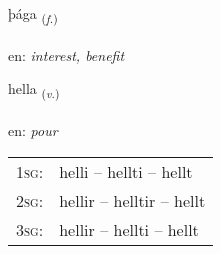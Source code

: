 \documentclass[frontgrid, backgrid]{flacards}\usepackage[]{graphicx}\usepackage[]{color}
\begin{document}
\renewcommand{\flhead}{\vskip5pt \fboxsep=0pt {\small\bfseries\footnotesize Nafnorð | Noun}}
\renewcommand{\fcfoot}{\vskip5pt \fboxsep=0pt \hspace{2pt}{\small\bfseries\footnotesize 2K}}

\renewcommand{\blhead}{\vskip5pt {\small\bfseries\footnotesize Nafnorð | Noun }}
\renewcommand{\bcfoot}{\vskip5pt \hspace{2pt}{\small\bfseries\footnotesize 2K}}


{þága \small{\textsubscript{(\textit{f.})}} \\[1ex] %
\textphonetic{[θauːɣa]} \\
en: \emph{interest, benefit} \\  [2ex]
\renewcommand*{\arraystretch}{0.8}
}

\renewcommand{\flhead}{\vskip5pt \fboxsep=0pt {\small\bfseries\footnotesize Sagnorð | Verb}}
\renewcommand{\fcfoot}{\vskip5pt \fboxsep=0pt \hspace{2pt}{\small\bfseries\footnotesize 2K}}

\renewcommand{\blhead}{\vskip5pt {\small\bfseries\footnotesize Sagnorð | Verb }}
\renewcommand{\bcfoot}{\vskip5pt \hspace{2pt}{\small\bfseries\footnotesize 2K}}


{hella \small{\textsubscript{(\textit{v.})}} \\[1ex] %
\textphonetic{[hɛtla]} \\
en: \emph{pour} \\  [2ex]
\renewcommand*{\arraystretch}{0.8}
\begin{tabular}{p{1cm}l}
\textsc{1sg}: & helli -- hellti -- hellt \\ 
\textsc{2sg}: & hellir -- helltir -- hellt \\ 
\textsc{3sg}: & hellir -- hellti -- hellt \\ 
\end{tabular}
}
\end{document}
